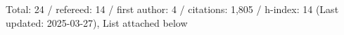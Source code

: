 Total: 24 / refereed: 14 / first author: 4 / citations: 1,805 / h-index: 14 (Last updated: 2025-03-27), List attached below